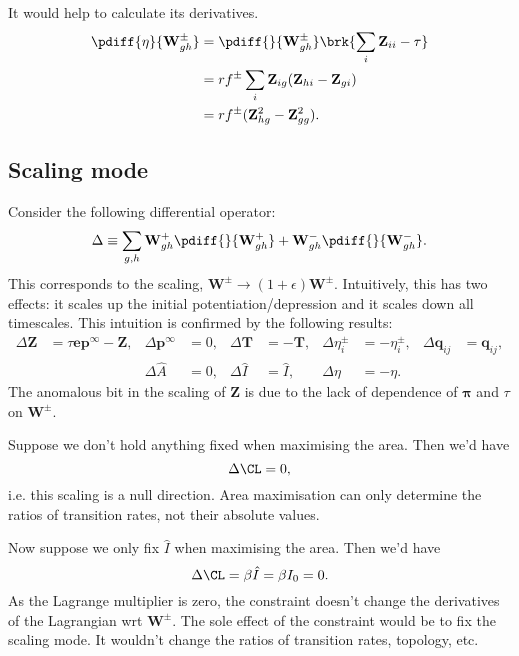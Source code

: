 \documentclass[12pt]{article}
\newcommand{\onev}{\mathbf{e}}
\newcommand{\eq}{\mathbf{p}^\infty}
\newcommand{\fpt}{\mathbf{T}}
\newcommand{\fund}{\mathbf{Z}}
\newcommand{\pib}{\boldsymbol{\pi}}
\newcommand{\W}{\mathbf{W}}
\newcommand{\enc}{\mathbf{q}}
\begin{document}
It would help to calculate its derivatives.
%
\begin{equation}\label{eq:mixingdiff}
  \begin{aligned}
    \pdiff{\eta}{\W^\pm_{gh}} &= \pdiff{}{\W^\pm_{gh}}\brk{\sum_i \fund_{ii} - \tau} \\
      &= rf^\pm \sum_i \fund_{ig}(\fund_{hi}-\fund_{gi}) \\
      &= rf^\pm (\fund^2_{hg} - \fund^2_{gg}).
  \end{aligned}
\end{equation}
%

\subsection{Scaling mode}\label{sec:rescaleconstr}

Consider the following differential operator:
%
\begin{equation}\label{eq:scaleopapp}
  \Delta \equiv \sum_{g,h} \W^+_{gh}\pdiff{}{\W^+_{gh}} + \W^-_{gh}\pdiff{}{\W^-_{gh}}.
\end{equation}
%
This corresponds to the scaling, $\W^\pm \to (1+\epsilon)\W^\pm$. Intuitively, this has two effects: it scales up the initial potentiation/depression and it scales down all timescales. This intuition is confirmed by the following results:
%
\begin{equation}\label{eq:scaleeffectsapp}
  \begin{aligned}
    \Delta \fund &= \tau\onev\eq - \fund ,&
    \Delta \eq  &= 0 ,&
    \Delta \fpt  &= -\fpt ,&
    \Delta \eta^\pm_i  &= - \eta^\pm_i ,&
    \Delta \enc_{ij} &= \enc_{ij} ,
    \\&&
    \Delta \hat{A}  &= 0 ,&
    \Delta \hat{I} &= \hat{I} ,&
    \Delta \eta  &= -\eta .
  \end{aligned}
\end{equation}
%
The anomalous bit in the scaling of $\fund$ is due to the lack of dependence of $\pib$ and $\tau$ on $\W^\pm$.

Suppose we don't hold anything fixed when maximising the area. Then we'd have
%
\begin{equation*}
  \Delta \CL = 0,
\end{equation*}
%
i.e. this scaling is a null direction. Area maximisation can only determine the ratios of transition rates, not their absolute values.

Now suppose we only fix $\hat{I}$ when maximising the area. Then we'd have
%
\begin{equation*}
  \Delta \CL = \beta \hat{I} = \beta I_0 = 0.
\end{equation*}
%
As the Lagrange multiplier is zero, the constraint doesn't change the derivatives of the Lagrangian wrt $\W^\pm$. The sole effect of the constraint would be to fix the scaling mode. It wouldn't change the ratios of transition rates, topology, etc.
\end{document}
